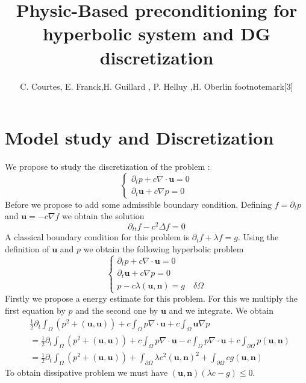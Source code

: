 \documentclass[a4paper,twoside,french,english,11pt]{article}
\title{Physic-Based preconditioning for hyperbolic system and DG discretization}
\author{C. Courtes\footnotemark[4], E. Franck\footnotemark[1],\quad H. Guillard \footnotemark[3], \quad P. Helluy \footnotemark[3],H. Oberlin footnotemark[3]}
\newcommand{\ds}{\displaystyle}
\newcommand{\dt}{\partial_t}
\begin{document}
\maketitle


\tableofcontents

\section{Model study and Discretization}
We propose to study the discretization of the problem :
$$
\left\{\begin{array}{l}
\ds \dt p+c\nabla \cdot \bm{u}=0\\
\ds \dt \bm{u}+c\nabla p = 0 \end{array}\right.
$$
Before we propose to add some admissible boundary condition. Defining $f=\dt p$ and $\bm{u}=- c\nabla f$ we obtain the solution
$$
\partial_{tt} f-c^2\Delta f=0
$$
A classical boundary condition for this problem is $\dt f+ \lambda f=g$. Using the definition of $\bm{u}$ and $p$ we obtain the following hyperbolic problem
$$
\left\{\begin{array}{l}
\ds \dt p+c\nabla \cdot \bm{u}=0\\
\ds \dt \bm{u}+c\nabla p = 0 \\
p-c \lambda (\bm{u},\bm{n})=g\quad \delta \Omega \end{array}\right.
$$
Firstly we propose a energy estimate for this problem. For this we multiply the first equation by $p$ and the second one by $\bm{u}$ and we integrate. We obtain
\begin{align*}
& \frac{1}{2}\dt\int_{\Omega}(p^2+(\bm{u},\bm{u}))+c\int_{\Omega}p\nabla \cdot \bm{u} + c\int_{\Omega} \bm{u} \nabla p\\
&=  \frac{1}{2}\dt \int_{\Omega}(p^2+(\bm{u},\bm{u}))+c\int_{\Omega}p\nabla \cdot \bm{u} - c\int_{\Omega}p\nabla \cdot \bm{u}+c\int_{\partial \Omega} p (\bm{u},\bm{n})\\
&=  \frac{1}{2}\dt \int_{\Omega}(p^2+(\bm{u},\bm{u}))+\int_{\partial \Omega} \lambda c^2 (\bm{u},\bm{n})^2+ \int_{\partial \Omega} c g (\bm{u},\bm{n})
\end{align*}
To obtain dissipative problem we must have $(\bm{u},\bm{n})(\lambda c -g)\leq 0$.
\end{document}

